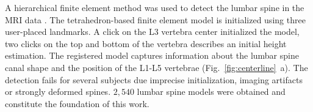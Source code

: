 \documentclass[a4paper,twoside]{style/article}
\newcommand{\com}[1]{\textcolor{orange}{\uline{#1}}}
\begin{document}
A hierarchical finite element method was used to detect the lumbar spine in the MRI data \cite{Rak2013}.
The tetrahedron-based finite element model is initialized using three user-placed landmarks.
A click on the L3 vertebra center initialized the model, two clicks on the top and bottom of the vertebra describes an initial height estimation.
The registered model captures information about the lumbar spine canal shape and the position of the L1-L5 vertebrae \cite{Klemm2013VMV} (Fig.~\ref{fig:centerline}~a).
The detection fails for several subjects due imprecise initialization, imaging artifacts or strongly deformed spines.
$2,540$ lumbar spine models were obtained and constitute the foundation of this work.
\end{document}

